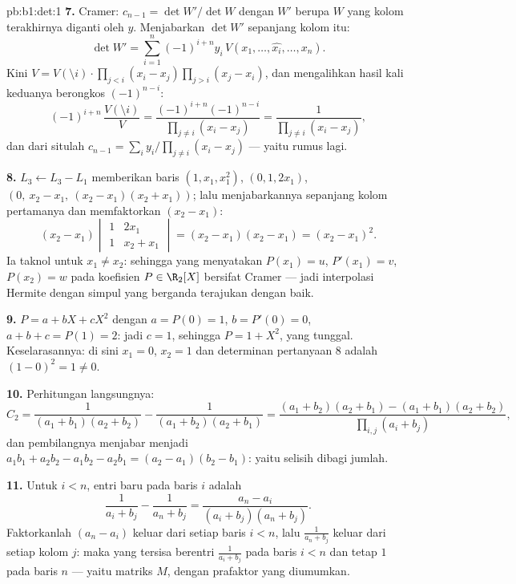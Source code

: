 \begin{solution}{pb:b1:det:1}
\textbf{7.} Cramer: $c_{n-1} = \det W'/\det W$ dengan $W'$ berupa $W$
yang kolom terakhirnya diganti oleh $y$. Menjabarkan $\det W'$ sepanjang
kolom itu:
\[
\det W' = \sum_{i=1}^n (-1)^{i+n} y_i\,V(x_1, \dots, \widehat{x_i},
\dots, x_n) .
\]
Kini $V = V(\setminus i)\cdot\prod_{j<i}(x_i - x_j)\prod_{j>i}
(x_j - x_i)$, dan mengalihkan hasil kali keduanya berongkos
$(-1)^{n-i}$:
\[
(-1)^{i+n}\,\frac{V(\setminus i)}{V}
= \frac{(-1)^{i+n}(-1)^{n-i}}{\prod_{j\neq i}(x_i - x_j)}
= \frac{1}{\prod_{j\neq i}(x_i - x_j)} ,
\]
dan dari situlah $c_{n-1} = \sum_i y_i/\prod_{j \neq i}(x_i - x_j)$ ---
yaitu rumus  lagi.

\textbf{8.} $L_3 \leftarrow L_3 - L_1$ memberikan baris $(1, x_1,
x_1^2)$, $(0, 1, 2x_1)$, $(0,\ x_2 - x_1,\ (x_2-x_1)(x_2+x_1))$;
lalu menjabarkannya sepanjang kolom pertamanya dan memfaktorkan $(x_2 - x_1)$:
\[
(x_2 - x_1)\begin{vmatrix} 1 & 2x_1\\ 1 & x_2 + x_1
\end{vmatrix} = (x_2 - x_1)(x_2 - x_1) = (x_2 - x_1)^2 .
\]
Ia taknol untuk $x_1 \neq x_2$: sehingga  yang menyatakan
$P(x_1) = u$, $P'(x_1) = v$, $P(x_2) = w$ pada koefisien
$P \in \R_2[X]$ bersifat Cramer --- jadi interpolasi Hermite dengan
simpul yang berganda terajukan dengan baik.

\textbf{9.} $P = a + bX + cX^2$ dengan $a = P(0) = 1$, $b = P'(0)
= 0$, $a + b + c = P(1) = 2$: jadi $c = 1$, sehingga $P = 1 + X^2$, yang tunggal.
Keselarasannya: di sini $x_1 = 0$, $x_2 = 1$ dan determinan
pertanyaan 8 adalah $(1 - 0)^2 = 1 \neq 0$.

\textbf{10.} Perhitungan langsungnya:
\[
C_2 = \frac{1}{(a_1+b_1)(a_2+b_2)} - \frac{1}{(a_1+b_2)(a_2+b_1)}
= \frac{(a_1+b_2)(a_2+b_1) - (a_1+b_1)(a_2+b_2)}
{\prod_{i,j}(a_i+b_j)} ,
\]
dan pembilangnya menjabar menjadi $a_1b_1 + a_2b_2 - a_1b_2 - a_2b_1
= (a_2 - a_1)(b_2 - b_1)$: yaitu selisih dibagi jumlah.

\textbf{11.} Untuk $i < n$, entri baru pada baris $i$ adalah
\[
\frac{1}{a_i + b_j} - \frac{1}{a_n + b_j}
= \frac{a_n - a_i}{(a_i + b_j)(a_n + b_j)} .
\]
Faktorkanlah $(a_n - a_i)$ keluar dari setiap baris $i < n$, lalu
$\frac1{a_n + b_j}$ keluar dari setiap kolom $j$: maka yang tersisa berentri
$\frac1{a_i + b_j}$ pada baris $i < n$ dan tetap $1$ pada
baris $n$ --- yaitu matriks $M$, dengan prafaktor yang diumumkan.


\end{solution}
